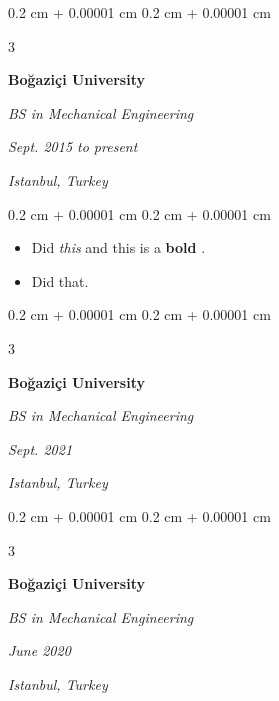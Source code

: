 \documentclass[10pt, letterpaper]{article}
\newenvironment{highlights}{
    \begin{itemize}[
        topsep=0.10 cm,
        parsep=0.10 cm,
        partopsep=0pt,
        itemsep=0pt,
        leftmargin=0.4 cm + 10pt + 0.6 cm
    ]
}{
    \end{itemize}
} %
\newenvironment{onecolentry}{
    \begin{adjustwidth}{
        0.2 cm + 0.00001 cm
    }{
        0.2 cm + 0.00001 cm
    }
}{
    \end{adjustwidth}
} %
\newenvironment{threecolentry}[3][]{
    \onecolentry
    \def\thirdColumn{#3}
    \setcolumnwidth{0.6 cm, \fill, 4.1 cm}
    \begin{paracol}{3}
    #2 \switchcolumn
}{
    \switchcolumn \raggedleft \thirdColumn
    \end{paracol}
    \endonecolentry
} %
\let\hrefWithoutArrow\href
\renewcommand{\href}[2]{\hrefWithoutArrow{#1}{\mbox{\ifthenelse{\equal{#2}{}}{ }{#2 }\raisebox{.15ex}{\footnotesize \faExternalLink*}}}}
\begin{document}
        \vspace{0.2 cm}

        \begin{threecolentry}{
            \vspace*{\fill}
            \textbullet
            \vspace*{3px}
            \vspace*{\fill}
        }{
        \textit{Sept. 2015 to present}
            
        \textit{Istanbul, Turkey}}
            \textbf{Boğaziçi University}

            \textit{BS in Mechanical Engineering}
        \end{threecolentry}

        \vspace{0.10 cm}
        \begin{onecolentry}
            \begin{highlights}
                \item Did \textit{this} and this is a \textbf{bold} \href{https://example.com}{link}.
                \item Did that.
            \end{highlights}
        \end{onecolentry}


        \vspace{0.2 cm}

        \begin{threecolentry}{
            \vspace*{\fill}
            \textbullet
            \vspace*{3px}
            \vspace*{\fill}
        }{
        \textit{Sept. 2021}
            
        \textit{Istanbul, Turkey}}
            \textbf{Boğaziçi University}

            \textit{BS in Mechanical Engineering}
        \end{threecolentry}



        \vspace{0.2 cm}

        \begin{threecolentry}{
            \vspace*{\fill}
            \textbullet
            \vspace*{3px}
            \vspace*{\fill}
        }{
        \textit{June 2020}
            
        \textit{Istanbul, Turkey}}
            \textbf{Boğaziçi University}

            \textit{BS in Mechanical Engineering}
        \end{threecolentry}
\end{document}
